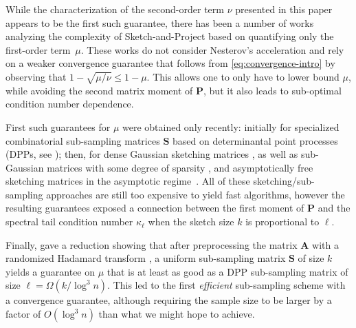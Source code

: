 \documentclass[11pt]{article}
\def\A{{\mathbf A}}
\def\S{{\mathbf S}}
\def\P{{\mathbf P}}
\begin{document}
While the characterization of the second-order term $\nu$ presented in this paper appears to be the first such guarantee, there has been a number of works analyzing the complexity of Sketch-and-Project \cite{rk20,mdk20,derezinski2024sharp,derezinski2023solving} based on quantifying only the first-order term~$\mu$. These works do not consider Nesterov's acceleration and rely on a weaker convergence guarantee that follows from  \eqref{eq:convergence-intro} by observing that $1-\sqrt{\mu/\nu}\leq 1-\mu$. This allows one to only have to lower bound $\mu$, while avoiding the second matrix moment of $\P$, but it also leads to sub-optimal condition number dependence.

First such guarantees for $\mu$ were obtained only recently: initially for specialized combinatorial sub-sampling matrices $\S$ based on determinantal point processes (DPPs, see \cite{rk20,mdk20}); then,  for dense Gaussian sketching matrices \cite{rebrova2021block}, as well as sub-Gaussian matrices with some degree of sparsity \cite{derezinski2024sharp}, and asymptotically free sketching matrices in the asymptotic regime~\cite{lejeune2024asymptotics}. 
All of these sketching/sub-sampling approaches are still too expensive to yield fast algorithms, however the resulting guarantees exposed a connection between the first moment of $\P$ and the spectral tail condition number $\kappa_\ell$ when the sketch size $k$ is proportional to $\ell$.

Finally, \cite{derezinski2023solving} gave a reduction showing that after preprocessing the matrix $\A$ with a randomized Hadamard transform \cite{ailon2009fast}, a uniform sub-sampling matrix $\S$ of size $k$ yields a guarantee on $\mu$ that is at least as good as a DPP sub-sampling matrix of size $\ell = \Omega(k/\log^3 n)$. 
This led to the first \emph{efficient} sub-sampling scheme with a convergence guarantee, although requiring the sample size to be larger by a factor of $O(\log^3 n)$ than what we might hope to achieve.

\smallskip
\end{document}
